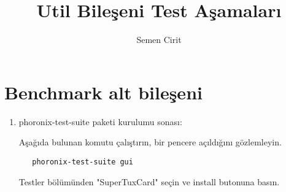 \documentclass[a4paper,10pt]{article}
\title{Util Bileşeni Test Aşamaları}
\author{Semen Cirit}
\begin{document}
\maketitle
\section{Benchmark alt bileşeni}
\begin{enumerate}
 \item phoronix-test-suite paketi kurulumu sonası:

Aşağıda bulunan komutu çalıştırın, bir pencere açıldığını gözlemleyin.
  \begin{verbatim}
   phoronix-test-suite gui
  \end{verbatim}

Testler bölümünden "SuperTuxCard" seçin ve install butonuna basın. 

\end{enumerate}
\end{document}

